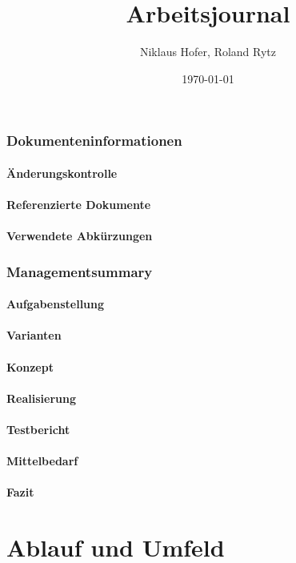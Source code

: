 \documentclass[11pt,paper=a4,final]{scrartcl}
\title{Arbeitsjournal}
\author{Niklaus Hofer, Roland Rytz}
\date{\today{}}
\begin{document}
\maketitle
\newpage
\section{Dokumenteninformationen}
\subsection{\"Anderungskontrolle}
\subsection{Referenzierte Dokumente}
\subsection{Verwendete Abk\"urzungen}
\tableofcontents
\listoffigures
\listoftables
\section{Managementsummary}
\subsection{Aufgabenstellung}
\subsection{Varianten}
\subsection{Konzept}
\subsection{Realisierung}
\subsection{Testbericht}
\subsection{Mittelbedarf}
\subsection{Fazit}
\part{Ablauf und Umfeld}
\end{document}
